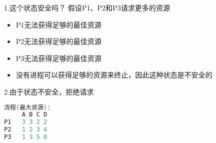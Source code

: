 1.这个状态安全吗？ 假设P1、P2和P3请求更多的资源
\begin{itemize}
\item P1无法获得足够的最佳资源
\item P2无法获得足够的最佳资源
\item P3无法获得足够的最佳资源
\item 没有进程可以获得足够的资源来终止，因此这种状态是不安全的
\end{itemize}

2.由于状态不安全，拒绝请求
\begin{lstlisting}[language=cpp]
    流程(最大资源):
     A B C D
P1   3 3 2 2
P2   1 2 3 4
P3   1 3 5 0
\end{lstlisting}